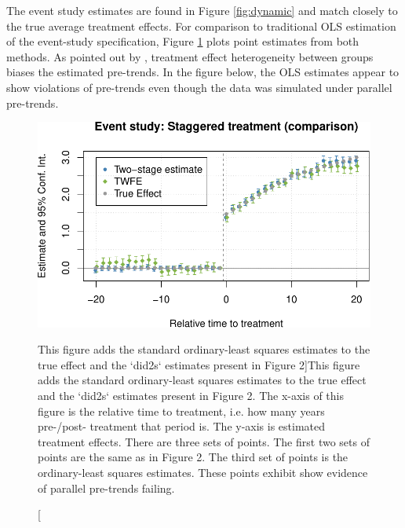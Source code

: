 The event study estimates are found in Figure \ref{fig:dynamic} and
match closely to the true average treatment effects. For comparison to
traditional OLS estimation of the event-study specification, Figure
\ref{fig:dynamic-w-twfe} plots point estimates from both methods. As
pointed out by \citet{Sun_Abraham_2020}, treatment effect heterogeneity
between groups biases the estimated pre-trends. In the figure below, the
OLS estimates appear to show violations of pre-trends even though the
data was simulated under parallel pre-trends.

\begin{Schunk}
\begin{figure}
\includegraphics[width=1\linewidth]{did2s_files/figure-latex/dynamic-w-twfe-1} \caption[This figure adds the standard ordinary-least squares estimates to the true effect and the `did2s` estimates present in Figure 2]{This figure adds the standard ordinary-least squares estimates to the true effect and the `did2s` estimates present in Figure 2. The x-axis of this figure is the relative time to treatment, i.e. how many years pre-/post- treatment that period is. The y-axis is estimated treatment effects. There are three sets of points. The first two sets of points are the same as in Figure 2. The third set of points is the ordinary-least squares estimates. These points exhibit show evidence of parallel pre-trends failing.}\label{fig:dynamic-w-twfe}
\end{figure}
\end{Schunk}


